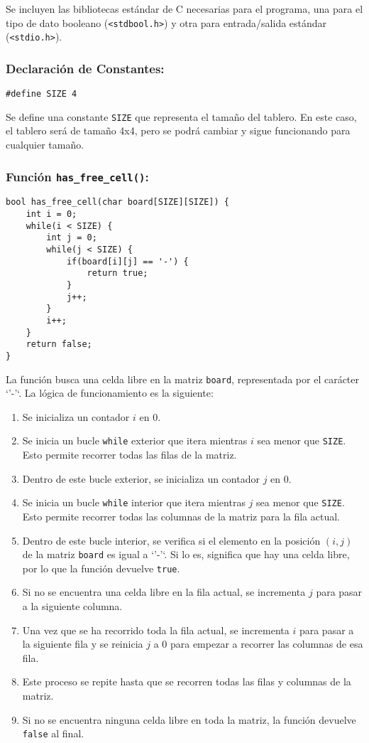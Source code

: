 Se incluyen las bibliotecas estándar de C necesarias para el programa, una para el tipo de dato booleano (\texttt{<stdbool.h>}) y otra para entrada/salida estándar (\texttt{<stdio.h>}). 

\subsubsection{Declaración de Constantes:}
\begin{verbatim}
#define SIZE 4
\end{verbatim}
Se define una constante \texttt{SIZE} que representa el tamaño del tablero. En este caso, el tablero será de tamaño 4x4, pero se podrá cambiar y sigue funcionando para cualquier tamaño.

\subsubsection{Función \texttt{has\_free\_cell()}:}
\begin{verbatim}
bool has_free_cell(char board[SIZE][SIZE]) {
    int i = 0;
    while(i < SIZE) {
        int j = 0;
        while(j < SIZE) {
            if(board[i][j] == '-') {
                return true;
            }
            j++;
        }
        i++;
    }
    return false;
}
\end{verbatim}

La función busca una celda libre en la matriz \texttt{board}, representada por el carácter `'-'`. La lógica de funcionamiento es la siguiente:

\begin{enumerate}
    \item Se inicializa un contador $i$ en 0.
    \item Se inicia un bucle \texttt{while} exterior que itera mientras $i$ sea menor que \texttt{SIZE}. Esto permite recorrer todas las filas de la matriz.
    \item Dentro de este bucle exterior, se inicializa un contador $j$ en 0.
    \item Se inicia un bucle \texttt{while} interior que itera mientras $j$ sea menor que \texttt{SIZE}. Esto permite recorrer todas las columnas de la matriz para la fila actual.
    \item Dentro de este bucle interior, se verifica si el elemento en la posición $(i, j)$ de la matriz \texttt{board} es igual a `'-'`. Si lo es, significa que hay una celda libre, por lo que la función devuelve \texttt{true}.
    \item Si no se encuentra una celda libre en la fila actual, se incrementa $j$ para pasar a la siguiente columna.
    \item Una vez que se ha recorrido toda la fila actual, se incrementa $i$ para pasar a la siguiente fila y se reinicia $j$ a 0 para empezar a recorrer las columnas de esa fila.
    \item Este proceso se repite hasta que se recorren todas las filas y columnas de la matriz.
    \item Si no se encuentra ninguna celda libre en toda la matriz, la función devuelve \texttt{false} al final.
\end{enumerate}

